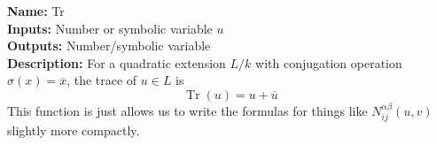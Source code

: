 \documentclass[12pt]{article}
\theoremstyle{definition}
\numberwithin{theorem}{subsection}
\newcommand{\sig}{\sigma}
\newcommand{\tbf}{\textbf}
\newcommand{\noi}{\noindent}
\newcommand{\ov}{\overline}
\DeclareMathOperator{\Tr}{Tr}
\begin{document}


\begin{framed}
\noi \tbf{Name:} Tr \\
\noi \tbf{Inputs:} Number or symbolic variable $u$ \\
\noi \tbf{Outputs:} Number/symbolic variable \\
\noi \tbf{Description:} For a quadratic extension $L/k$ with conjugation operation $\sig(x) = \ov x$, the trace of $u \in L$ is
\[
	\Tr(u) = u + \ov u
\]
This function is just allows us to write the formulas for things like $N_{ij}^{\alpha \beta}(u,v)$ slightly more compactly.
\end{framed}
\end{document}
